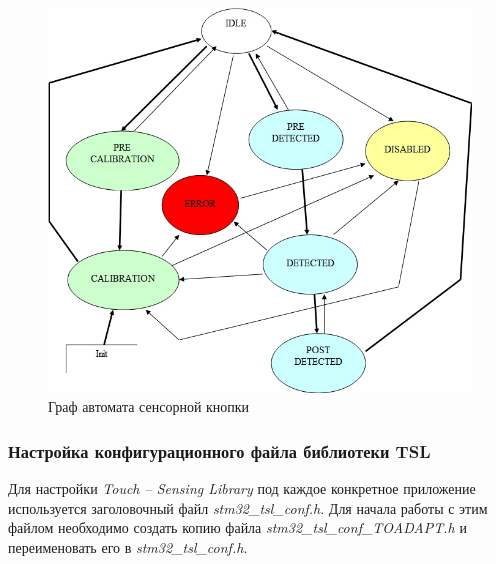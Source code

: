 \begin{figure}[H]
\begin{center}
\includegraphics[scale=0.45]{Image/64.jpg} 
\end{center}
\caption{Граф автомата сенсорной кнопки}
\end{figure}

\subsubsection{Настройка конфигурационного файла библиотеки TSL}

Для настройки \textit{Touch --  Sensing Library} под каждое конкретное приложение используется заголовочный файл \textit{stm32\_tsl\_conf.h}. Для начала работы с этим файлом необходимо создать копию файла \textit{stm32\_tsl\_conf\_TOADAPT.h} и переименовать его в \textit{stm32\_tsl\_conf.h}. 
	
